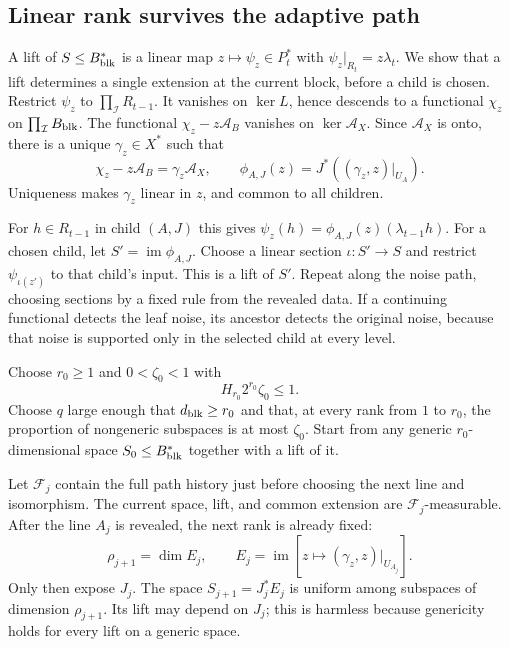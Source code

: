 \documentclass[11pt]{article}
\begin{document}
\subsection{Linear rank survives the adaptive path}
\label{latent:rank}

A lift of $S\le B_{\rm blk}^*$ is a linear map $z\mapsto\psi_z\in P_t^*$ with
$\psi_z|_{R_t}=z\lambda_t$. We show that a lift determines a single
extension at the current block, before a child is chosen.
Restrict $\psi_z$ to $\prod_{\mathcal I}R_{t-1}$. It vanishes on
$\ker L$, hence descends to a functional $\chi_z$ on
$\prod_{\mathcal I}B_{\rm blk}$. The functional $\chi_z-z\mathcal A_B$ vanishes
on $\ker\mathcal A_X$. Since $\mathcal A_X$ is onto, there is a unique
$\gamma_z\in X^*$ such that
\begin{equation}
 \chi_z-z\mathcal A_B=\gamma_z\mathcal A_X,\qquad
 \phi_{A,J}(z)=J^*((\gamma_z,z)|_{U_A}).
 \label{latent:common-extension}
\end{equation}
Uniqueness makes $\gamma_z$ linear in $z$, and common to all children.

For $h\in R_{t-1}$ in child $(A,J)$ this gives
$\psi_z(h)=\phi_{A,J}(z)(\lambda_{t-1}h)$. For a chosen child, let
$S'=\operatorname{im}\phi_{A,J}$. Choose a linear section $\iota:S'\to S$ and restrict $\psi_{\iota(z')}$ to that
child's input. This is a lift of $S'$. Repeat along the noise path,
choosing sections by a fixed rule from the revealed data. If a
continuing functional detects the leaf noise, its ancestor detects
the original noise, because that noise is supported only in the
selected child at every level.

Choose $r_0\ge1$ and $0<\zeta_0<1$ with
\[
 H_{r_0}2^{r_0}\zeta_0\le1.
\]
Choose $q$ large enough that $d_{\rm blk}\ge r_0$ and that, at every rank from
$1$ to $r_0$, the proportion of nongeneric subspaces is at most
$\zeta_0$. Start from any generic $r_0$-dimensional space $S_0\le B_{\rm blk}^*$ together
with a lift of it.

Let $\mathcal F_j$ contain the full path history just before choosing
the next line and isomorphism. The current space, lift, and common
extension are $\mathcal F_j$-measurable. After the line $A_j$ is
revealed, the next rank is already fixed:
\[
 \rho_{j+1}=\dim E_j,\qquad
 E_j=\operatorname{im}[z\mapsto(\gamma_z,z)|_{U_{A_j}}].
\]
Only then expose $J_j$. The space $S_{j+1}=J_j^*E_j$ is uniform among
subspaces of dimension $\rho_{j+1}$. Its lift may depend on $J_j$; this
is harmless because genericity holds for every lift on a generic
space.
\end{document}

